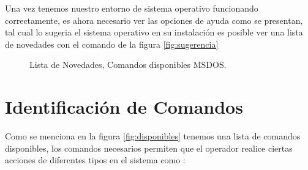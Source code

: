 \documentclass[paper=a4, fontsize=12pt]{article} 		%
\numberwithin{equation}{section}						%
\numberwithin{table}{section} 							%
\begin{document}
Una vez tenemos nuestro entorno de sistema operativo funcionando correctamente, es ahora necesario ver las opciones  de ayuda como se presentan, tal cual lo sugeria el sistema operativo en su instalación es posible ver una lista de novedades con el comando de la figura \ref{fig:sugerencia}
\begin{figure}[H]
 	\centering
        \hfill
	\caption{Lista de Novedades, Comandos disponibles MSDOS.}
\end{figure}
\section{ Identificación de  Comandos }
Como se menciona en la figura \ref{fig:disponibles} tenemos una  lista de  comandos disponibles, los comandos necesarios permiten que el operador realice ciertas acciones de  diferentes  tipos en el sistema como  :  
\end{document}
